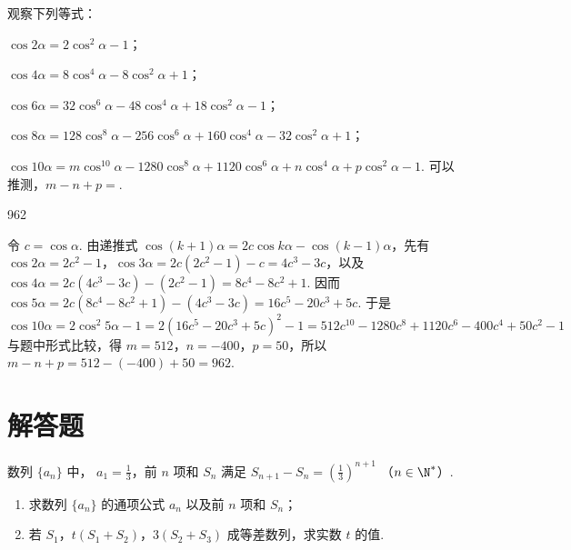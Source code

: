 \begin{problem}
观察下列等式：
\begin{circlelist}
\item \(\cos 2\alpha=2\cos^{2}\alpha-1\)；
\item \(\cos 4\alpha=8\cos^{4}\alpha-8\cos^{2}\alpha+1\)；
\item \(\cos 6\alpha=32\cos^{6}\alpha-48\cos^{4}\alpha+18\cos^{2}\alpha-1\)；
\item \(\cos 8\alpha=128\cos^{8}\alpha-256\cos^{6}\alpha+160\cos^{4}\alpha-32\cos^{2}\alpha+1\)；
\item \(\cos 10\alpha=m\cos^{10}\alpha-1280\cos^{8}\alpha+1120\cos^{6}\alpha+n\cos^{4}\alpha+p\cos^{2}\alpha-1\). 可以推测，\(m-n+p=\)\fillinblank{}.
\end{circlelist}
\end{problem}

\begin{answer}
962
\end{answer}

\begin{solution}
令 \(c=\cos\alpha\). 由递推式 \(\cos(k+1)\alpha=2c\cos k\alpha-\cos(k-1)\alpha\)，先有
\(\cos2\alpha=2c^2-1\)，\(\cos3\alpha=2c(2c^2-1)-c=4c^3-3c\)，以及
\(\cos4\alpha=2c(4c^3-3c)-(2c^2-1)=8c^4-8c^2+1\). 因而
\(\cos5\alpha=2c(8c^4-8c^2+1)-(4c^3-3c)=16c^5-20c^3+5c\). 于是
\[
\cos10\alpha=2\cos^2 5\alpha-1=2(16c^5-20c^3+5c)^2-1=512c^{10}-1280c^8+1120c^6-400c^4+50c^2-1
\]
与题中形式比较，得 \(m=512\)，\(n=-400\)，\(p=50\)，所以
\(m-n+p=512-(-400)+50=962\).
\end{solution}

\section{解答题}

\begin{problem}
数列 \( \{a_{n}\} \) 中， \( a_{1}=\frac{1}{3} \)，前 \(n\) 项和 \( S_{n} \) 满足 \( S_{n+1}-S_{n}=\left(\frac{1}{3}\right)^{n+1} \) （\(n\in\N^{*}\)）.

\begin{enumerate}
\item 求数列 \( \{a_{n}\} \) 的通项公式 \( a_{n} \) 以及前 \(n\) 项和 \( S_{n} \)；
\item 若 \(S_{1}\)，\(t\left(S_{1}+S_{2}\right)\)，\(3\left(S_{2}+S_{3}\right)\) 成等差数列，求实数 \(t\) 的值.
\end{enumerate}
\end{problem}

